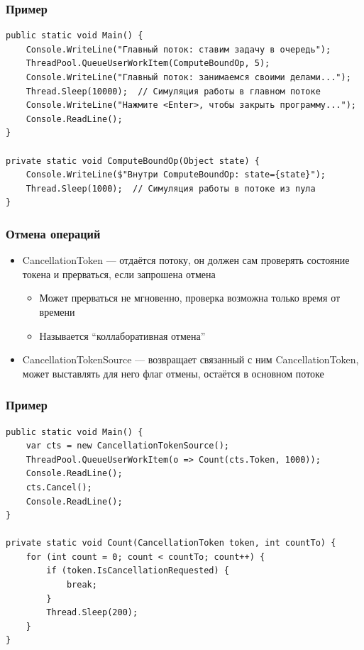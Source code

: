 \documentclass[xetex,mathserif,serif]{beamer}
\begin{document}
    \begin{frame}[fragile]
        \frametitle{Пример}
        \begin{verbatim}
public static void Main() {
    Console.WriteLine("Главный поток: ставим задачу в очередь");
    ThreadPool.QueueUserWorkItem(ComputeBoundOp, 5);
    Console.WriteLine("Главный поток: занимаемся своими делами...");
    Thread.Sleep(10000);  // Симуляция работы в главном потоке
    Console.WriteLine("Нажмите <Enter>, чтобы закрыть программу...");
    Console.ReadLine();
}

private static void ComputeBoundOp(Object state) {
    Console.WriteLine($"Внутри ComputeBoundOp: state={state}");
    Thread.Sleep(1000);  // Симуляция работы в потоке из пула
}
        \end{verbatim}
    \end{frame}

    \begin{frame}
        \frametitle{Отмена операций}
        \begin{itemize}
            \item CancellationToken --- отдаётся потоку, он должен сам проверять состояние токена и прерваться, если запрошена отмена
            \begin{itemize}
                \item Может прерваться не мгновенно, проверка возможна только время от времени
                \item Называется ``коллаборативная отмена''
            \end{itemize}
            \item CancellationTokenSource --- возвращает связанный с ним CancellationToken, может выставлять для него флаг отмены, остаётся в основном потоке
        \end{itemize}
    \end{frame}

    \begin{frame}[fragile]
        \frametitle{Пример}
        \begin{small}
            \begin{verbatim}
public static void Main() {
    var cts = new CancellationTokenSource();
    ThreadPool.QueueUserWorkItem(o => Count(cts.Token, 1000));
    Console.ReadLine();
    cts.Cancel();
    Console.ReadLine();
}

private static void Count(CancellationToken token, int countTo) {
    for (int count = 0; count < countTo; count++) {
        if (token.IsCancellationRequested) {
            break;
        }
        Thread.Sleep(200); 
    }
}
            \end{verbatim}
        \end{small}
    \end{frame}
\end{document}
